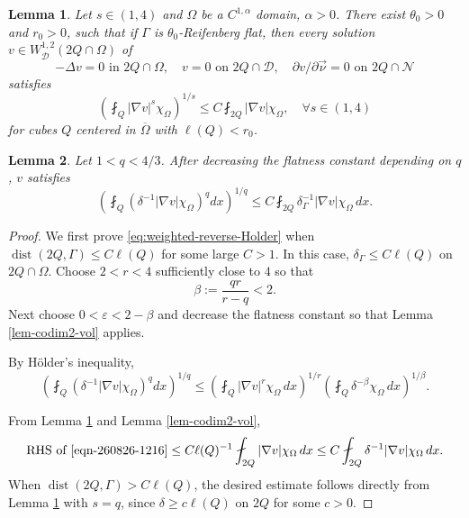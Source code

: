 \documentclass[10pt,a4paper]{amsart}
\newtheorem{lemma}{Lemma}
\newcommand\cD{\mathcal{D}}
\newcommand\cN{\mathcal{N}}
\newcommand\dist{\operatorname{dist}}
\newcommand{\epsi}{\varepsilon}
\newcommand{\p}{\partial}
\begin{document}
\begin{lemma} \label{lem-rev-holder}
    Let $s\in (1,4)$ and $\Omega$ be a $C^{1,\alpha}$ domain, $\alpha > 0$. 
    There exist $\theta_0>0$ and $r_0>0$, such that if $\Gamma$ is $\theta_0$-Reifenberg flat, then every solution $v \in W^{1,2}_{\cD}(2Q \cap \Omega)$ of
    \begin{equation} \label{eqn-260828-0335}
    -\Delta v = 0\,\,\text{in}\,\,2 Q \cap \Omega,
    \quad
    v = 0 \,\,\text{on}\,\, 2 Q \cap \cD,
    \quad
    \p v/\p \vec{\nu} = 0 \,\,\text{on}\,\, 2 Q \cap \cN
\end{equation}
satisfies
\begin{equation} \label{eqn-260826-1226}
    (\fint_{Q} |\nabla v|^s \chi_\Omega)^{1/s}
    \leq
    C \fint_{2Q} |\nabla v| \chi_\Omega,
    \quad \forall s\in (1,4)
\end{equation}
for cubes $Q$ centered in $\overline\Omega$ with $\ell(Q)<r_0$.
\end{lemma}

\begin{lemma}
 \label{lem:weighted-reverse-Holder}
 Let $1<q<4/3$.  After decreasing the flatness constant depending on
$q$, $v$ satisfies
\begin{equation}
 \left(\fint_{Q}
  \left(\delta^{-1}|\nabla v|\chi_\Omega\right)^q dx
 \right)^{1/q}
 \leq C\fint_{2Q}
  \delta_\Gamma^{-1}|\nabla v|\chi_\Omega\,dx.
 \label{eq:weighted-reverse-Holder}
\end{equation}
\end{lemma}

\begin{proof}
We first prove \eqref{eq:weighted-reverse-Holder} when $\dist(2Q,\Gamma) \leq C \ell(Q)$ for some large $C>1$.  In this case, $\delta_\Gamma\leq C\ell(Q)$ on $2Q\cap\Omega$. Choose $2<r<4$ sufficiently close to $4$ so that
\begin{equation}
 \beta:=\frac{qr}{r-q}<2.
 \label{eq:weighted-beta}
\end{equation}
Next choose $0<\epsi <2-\beta$ and decrease the flatness constant so that
Lemma \ref{lem-codim2-vol} applies.

By H\"older's inequality,
\begin{equation} \label{eqn-260826-1216}
 \left(\fint_{Q}
  \left( \delta^{-1} |\nabla v|\chi_\Omega\right)^q dx
 \right)^{1/q}
 \leq
 \left(\fint_{Q}|\nabla v|^r\chi_\Omega\,dx\right)^{1/r}
 \left(\fint_{Q}\delta^{-\beta}\chi_\Omega\,dx\right)^{1/\beta}.
\end{equation}

From Lemma \ref{lem-rev-holder} and Lemma \ref{lem-codim2-vol},
\begin{align*}
    \text{RHS of}\,\,\eqref{eqn-260826-1216}
     \leq C\ell(Q)^{-1}
       \fint_{2Q}|\nabla v|\chi_\Omega\,dx
 \leq C\fint_{2Q}
       \delta^{-1}|\nabla v|\chi_\Omega\,dx.
\end{align*}
When $\dist(2Q,\Gamma)> C \ell(Q)$, the desired estimate follows directly from Lemma \ref{lem-rev-holder} with $s=q$, since $\delta \geq c \ell(Q)$ on $2Q$ for some $c>0$. 
\end{proof}
\end{document}
